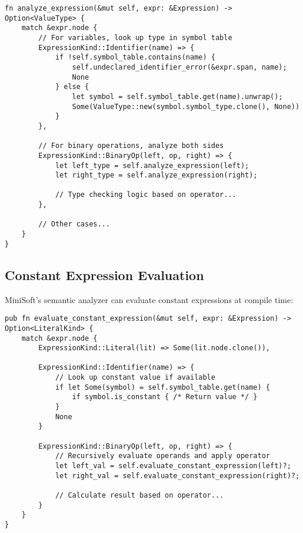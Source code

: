 \documentclass[12pt,a4paper]{article}
\begin{document}
\begin{lstlisting}[caption={Expression Analysis Example}]
fn analyze_expression(&mut self, expr: &Expression) -> Option<ValueType> {
    match &expr.node {
        // For variables, look up type in symbol table
        ExpressionKind::Identifier(name) => {
            if !self.symbol_table.contains(name) {
                self.undeclared_identifier_error(&expr.span, name);
                None
            } else {
                let symbol = self.symbol_table.get(name).unwrap();
                Some(ValueType::new(symbol.symbol_type.clone(), None))
            }
        },
        
        // For binary operations, analyze both sides
        ExpressionKind::BinaryOp(left, op, right) => {
            let left_type = self.analyze_expression(left);
            let right_type = self.analyze_expression(right);
            
            // Type checking logic based on operator...
        },
        
        // Other cases...
    }
}
\end{lstlisting}

\subsection{Constant Expression Evaluation}
MiniSoft's semantic analyzer can evaluate constant expressions at compile time:

\begin{lstlisting}[caption={Constant Evaluation}]
pub fn evaluate_constant_expression(&mut self, expr: &Expression) -> Option<LiteralKind> {
    match &expr.node {
        ExpressionKind::Literal(lit) => Some(lit.node.clone()),
        
        ExpressionKind::Identifier(name) => {
            // Look up constant value if available
            if let Some(symbol) = self.symbol_table.get(name) {
                if symbol.is_constant { /* Return value */ }
            }
            None
        }
        
        ExpressionKind::BinaryOp(left, op, right) => {
            // Recursively evaluate operands and apply operator
            let left_val = self.evaluate_constant_expression(left)?;
            let right_val = self.evaluate_constant_expression(right)?;
            
            // Calculate result based on operator...
        }
    }
}
\end{lstlisting}
\end{document}
